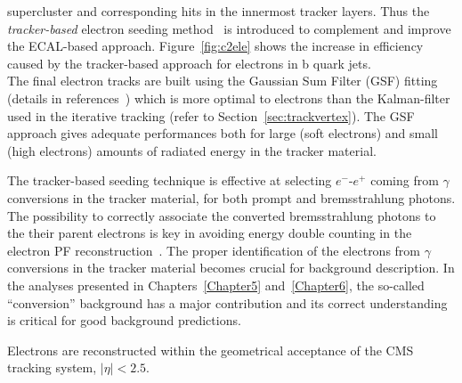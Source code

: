 supercluster and corresponding hits in the innermost tracker layers.
Thus the \emph{tracker-based} electron seeding
method~\cite{CMS:particleflow} is introduced to complement and improve
the ECAL-based approach. Figure~\ref{fig:c2ele} shows the increase in efficiency caused by the tracker-based approach for electrons in b quark jets.\\
The final electron tracks are built using the Gaussian Sum Filter
(GSF) fitting (details in references~\cite{CMS:particleflow, Adam_2005}) which is more optimal to electrons than the Kalman-filter used
in the iterative tracking (refer to
Section~\ref{sec:trackvertex}). The GSF approach gives adequate
performances both for large (\ie soft electrons) and small (\ie high \pt electrons) amounts of radiated energy in the
tracker material.

The tracker-based seeding technique is effective at selecting $e^{-}$-$e^{+}$ coming from $\gamma$ conversions
in the tracker material, for both prompt and bremsstrahlung
photons. The possibility to correctly associate the converted
bremsstrahlung photons
to the their parent electrons is key in avoiding energy double
counting in the electron PF reconstruction~\cite{CMS:particleflow}. The proper identification
of the electrons from $\gamma$ conversions
in the tracker material becomes crucial for background description. In
the analyses presented in
Chapters~\ref{Chapter5} and~\ref{Chapter6}, the so-called
``conversion'' background has a major contribution and its correct
understanding is critical for good background
predictions.

Electrons are reconstructed within the geometrical acceptance of the
CMS tracking system, $|\eta|<2.5$.

